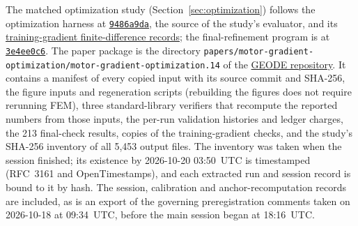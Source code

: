 \documentclass{anvil-paper}
\begin{document}
\begin{sloppypar}
The matched optimization study (Section~\ref{sec:optimization}) follows the
optimization harness at
\href{https://github.com/rjwalters/geode-fem/tree/9486a9da58beeca91968d4d3608f06b998abff45/benchmarks/motor_optimization}{\texttt{9486a9da}},
the source of the study's evaluator, and its
\href{https://github.com/rjwalters/geode-fem/tree/9486a9da58beeca91968d4d3608f06b998abff45/benchmarks/motor_optimization/runs}{training-gradient finite-difference records};
the final-refinement program is at
\href{https://github.com/rjwalters/geode-fem/tree/3e4ee0c63a86dbf014a76c9faf04dd962da16911/crates/geode-core/examples/icem_final_refinement.rs}{\texttt{3e4ee0c6}}.
The paper package is the directory
\texttt{papers/}\allowbreak\texttt{motor-gradient-optimization/}\allowbreak\texttt{motor-gradient-optimization.14}
of the \href{https://github.com/rjwalters/geode-fem}{GEODE repository}. It
contains a manifest of every copied input with its source commit and
SHA-256, the figure inputs and regeneration scripts (rebuilding the figures
does not require rerunning FEM), three standard-library verifiers that
recompute the reported numbers from those inputs, the per-run validation
histories and ledger charges, the 213 final-check results, copies of the
training-gradient checks, and the study's SHA-256 inventory of all 5,453
output files. The inventory was taken when the session finished; its
existence by 2026-10-20 03:50~UTC is timestamped (RFC~3161 and
OpenTimestamps), and each extracted run and session record is bound to it
by hash. The session, calibration and anchor-recomputation records are
included, as is an export of the governing preregistration comments taken
on 2026-10-18 at 09:34~UTC, before the main session began at 18:16~UTC.
\end{sloppypar}
\end{document}
